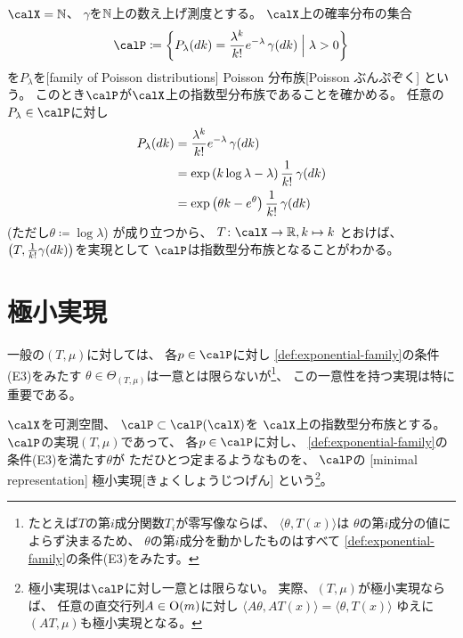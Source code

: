 \documentclass[report]{jlreq}
\begin{document}
\begin{example}
    $\calX = \N$、
    $\gamma$を$\mathbb{N}$上の数え上げ測度とする。
    $\calX$上の確率分布の集合
    \begin{equation}
        \calP \coloneqq \mybrace{
            P_\lambda(dk)
                = \frac{\lambda^k}{k!} e^{-\lambda} \, \gamma(dk)
            \;\Big|\;
            \lambda > 0
        }
    \end{equation}
    を$P_\lambda$を[family of Poisson distributions]
        {Poisson 分布族}[Poisson ぶんぷぞく]
    という。
    このとき$\calP$が$\calX$上の指数型分布族であることを確かめる。
    任意の$P_\lambda \in \calP$に対し
    \begin{alignat}{1}
        P_\lambda(dk)
            &= \frac{\lambda^k}{k!} e^{-\lambda} \, \gamma(dk) \\
            &= \exp\left({
                k \log\lambda - \lambda
            }\right) \frac{1}{k!} \, \gamma(dk) \\
            &= \exp\left({
                \theta k - e^\theta
            }\right) \frac{1}{k!} \, \gamma(dk)
    \end{alignat}
    (ただし$\theta \coloneqq \log \lambda$)
    が成り立つから、
    $T \colon \calX \to \R, k \mapsto k$
    とおけば、
    $\left({ T, \frac{1}{k!} \gamma(dk) }\right)$を実現として
    $\calP$は指数型分布族となることがわかる。
\end{example}

%
\section{極小実現}

一般の$(T, \mu)$に対しては、
各$p \in \calP$に対し
\cref{def:exponential-family}の条件(E3)をみたす
$\theta \in \Theta_{(T, \mu)}$は一意とは限らないが\footnote{
    たとえば$T$の第$i$成分関数$T_i$が零写像ならば、
    $\langle \theta, T(x) \rangle$は
    $\theta$の第$i$成分の値によらず決まるため、
    $\theta$の第$i$成分を動かしたものはすべて
    \cref{def:exponential-family}の条件(E3)をみたす。
}、
この一意性を持つ実現は特に重要である。

\begin{definition}[極小実現]
    $\calX$を可測空間、
    $\calP \subset \calP(\calX)$を
    $\calX$上の指数型分布族とする。
    $\calP$の実現$(T, \mu)$であって、
    各$p \in \calP$に対し、
    \cref{def:exponential-family}の条件(E3)を満たす$\theta$が
    ただひとつ定まるようなものを、
    $\calP$の
    [minimal representation]
        {極小実現}[きょくしょうじつげん]
    という\footnote{
        極小実現は$\calP$に対し一意とは限らない。
        実際、$(T, \mu)$が極小実現ならば、
        任意の直交行列$A \in \operatorname{\mathrm{O}}(m)$に対し
        $\langle A\theta, AT(x) \rangle = \langle \theta, T(x) \rangle$
        ゆえに$(AT, \mu)$も極小実現となる。
    }。
\end{definition}
\end{document}
